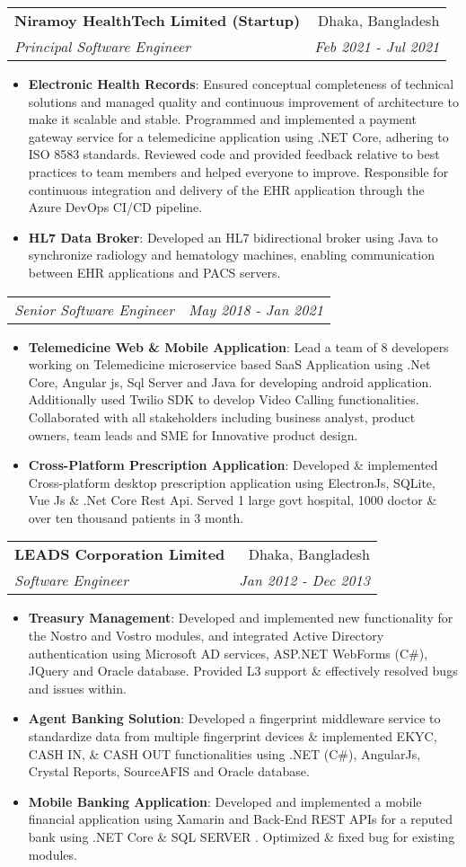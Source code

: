 \documentclass[letterpaper,11pt]{article}
\makeatletter
\newcommand{\resumeItem}[2]{
  \item\small{
    \textbf{#1}{: #2 \vspace{-2pt}}
  }
}
\newcommand{\resumeSubheading}[4]{
  \vspace{-1pt}\item
    \begin{tabular*}{0.97\textwidth}[t]{l@{\extracolsep{\fill}}r}
      \textbf{#1} & #2 \\
      \textit{\small#3} & \textit{\small #4} \\
    \end{tabular*}\vspace{-5pt}
}
\newcommand{\resumeSubSubheading}[2]{
    \begin{tabular*}{0.97\textwidth}{l@{\extracolsep{\fill}}r}
      \textit{\small#1} & \textit{\small #2} \\
    \end{tabular*}\vspace{-5pt}
}
\newcommand{\resumeItemListStart}{\begin{itemize}}
\newcommand{\resumeItemListEnd}{\end{itemize}\vspace{-5pt}}
\makeatother
\begin{document}
    \resumeSubheading
      {Niramoy HealthTech Limited (Startup) }{Dhaka, Bangladesh}
      {Principal Software Engineer}{Feb 2021 - Jul 2021}
      \resumeItemListStart
        \resumeItem{Electronic Health Records}
          {Ensured conceptual completeness of technical solutions and managed quality and continuous improvement of architecture to make it scalable and stable. 
          Programmed and implemented a payment gateway service for a telemedicine application using .NET Core, adhering to ISO 8583 standards. 
          Reviewed code and provided feedback relative to best practices to team members and helped everyone to improve.
          Responsible for continuous integration and delivery of the EHR application through the Azure DevOps CI/CD pipeline.}
        \resumeItem{HL7 Data Broker}
          {Developed an HL7 bidirectional broker using Java to synchronize radiology and hematology machines, enabling communication between EHR applications and PACS servers. \newline \newline \newline \newline}
      \resumeItemListEnd
      \resumeSubSubheading
      {Senior Software Engineer}{May 2018 - Jan 2021}
      \resumeItemListStart
        \resumeItem{Telemedicine Web \& Mobile Application}
         {Lead a team of 8 developers working on Telemedicine microservice based SaaS Application using .Net Core, Angular js, Sql Server and Java for developing android application. Additionally used Twilio SDK to develop Video Calling functionalities. Collaborated with all stakeholders including business analyst, product owners, team leads and
         SME for Innovative product design.}
        \resumeItem{Cross-Platform Prescription Application}
         {Developed \& implemented Cross-platform desktop prescription application using ElectronJs, SQLite,  Vue Js \& .Net Core Rest Api. Served 1 large govt hospital, 1000 doctor \& over ten thousand patients in 3 month.}
    \resumeItemListEnd
    
    \resumeSubheading
      {LEADS Corporation Limited}{Dhaka, Bangladesh}
      {Software Engineer}{Jan 2012 - Dec 2013}
      \resumeItemListStart
      \resumeItem{Treasury Management}
      {Developed and implemented new functionality for the Nostro and Vostro modules, and integrated Active Directory authentication using Microsoft AD services, ASP.NET WebForms (C\#), JQuery and Oracle database. Provided L3 support \& effectively resolved bugs and issues within.}
        \resumeItem{Agent Banking Solution}
          {Developed a fingerprint middleware service to standardize data from multiple fingerprint devices \& implemented EKYC, CASH IN, \& CASH OUT functionalities using .NET (C\#), AngularJs, Crystal Reports, SourceAFIS and Oracle database.}
        \resumeItem{Mobile Banking Application}
          {Developed and implemented a mobile financial application using Xamarin and  Back-End REST APIs for a reputed bank using .NET Core \& SQL SERVER . Optimized \& fixed bug for existing modules. }
      \resumeItemListEnd
\end{document}
